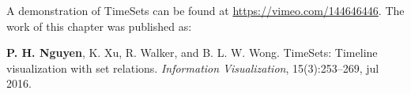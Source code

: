 A demonstration of TimeSets can be found at \url{https://vimeo.com/144646446}. The work of this chapter was published as:

\textbf{P. H. Nguyen}, K. Xu, R. Walker, and B. L. W. Wong. TimeSets: Timeline visualization with set relations. \textit{Information Visualization}, 15(3):253--269, jul 2016.








